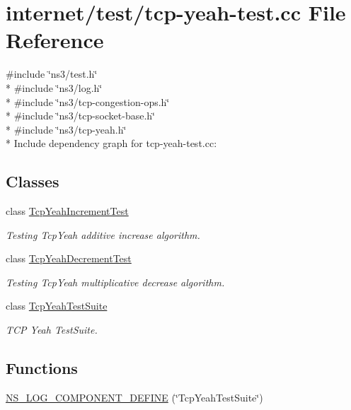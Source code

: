 \hypertarget{tcp-yeah-test_8cc}{}\section{internet/test/tcp-\/yeah-\/test.cc File Reference}
\label{tcp-yeah-test_8cc}
{\ttfamily \#include \char`\"{}ns3/test.\+h\char`\"{}}\\*
{\ttfamily \#include \char`\"{}ns3/log.\+h\char`\"{}}\\*
{\ttfamily \#include \char`\"{}ns3/tcp-\/congestion-\/ops.\+h\char`\"{}}\\*
{\ttfamily \#include \char`\"{}ns3/tcp-\/socket-\/base.\+h\char`\"{}}\\*
{\ttfamily \#include \char`\"{}ns3/tcp-\/yeah.\+h\char`\"{}}\\*
Include dependency graph for tcp-\/yeah-\/test.cc\+:
\subsection*{Classes}
\begin{DoxyCompactItemize}
\item 
class \hyperlink{classTcpYeahIncrementTest}{Tcp\+Yeah\+Increment\+Test}
\begin{DoxyCompactList}\small\item\em Testing Tcp\+Yeah additive increase algorithm. \end{DoxyCompactList}\item 
class \hyperlink{classTcpYeahDecrementTest}{Tcp\+Yeah\+Decrement\+Test}
\begin{DoxyCompactList}\small\item\em Testing Tcp\+Yeah multiplicative decrease algorithm. \end{DoxyCompactList}\item 
class \hyperlink{classTcpYeahTestSuite}{Tcp\+Yeah\+Test\+Suite}
\begin{DoxyCompactList}\small\item\em T\+CP Yeah Test\+Suite. \end{DoxyCompactList}\end{DoxyCompactItemize}
\subsection*{Functions}
\begin{DoxyCompactItemize}
\item 
\hyperlink{tcp-yeah-test_8cc_a211f668f2d631038b0a6c21a23179494}{N\+S\+\_\+\+L\+O\+G\+\_\+\+C\+O\+M\+P\+O\+N\+E\+N\+T\+\_\+\+D\+E\+F\+I\+NE} (\char`\"{}Tcp\+Yeah\+Test\+Suite\char`\"{})
\end{DoxyCompactItemize}
